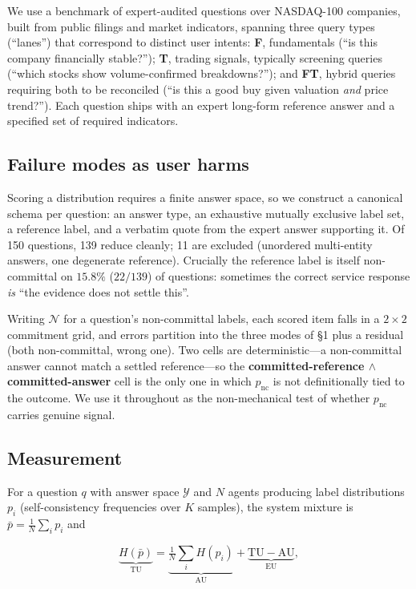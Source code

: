 \documentclass[sigconf,anonymous,review]{acmart}
\begin{document}
We use a benchmark of expert-audited questions over NASDAQ-100 companies,
built from public filings and market indicators, spanning three query types
(``lanes'') that correspond to distinct user intents: \textbf{F},
fundamentals (``is this company financially stable?''); \textbf{T}, trading
signals, typically screening queries (``which stocks show volume-confirmed
breakdowns?''); and \textbf{FT}, hybrid queries requiring both to be
reconciled (``is this a good buy given valuation \emph{and} price trend?'').
Each question ships with an expert long-form reference answer and a
specified set of required indicators.

\subsection{Failure modes as user harms}

Scoring a distribution requires a finite answer space, so we construct a
canonical schema per question: an answer type, an exhaustive mutually
exclusive label set, a reference label, and a verbatim quote from the expert
answer supporting it. Of 150 questions, 139 reduce cleanly; 11 are excluded
(unordered multi-entity answers, one degenerate reference). Crucially the
reference label is itself non-committal on $15.8\%$ ($22/139$) of questions:
sometimes the correct service response \emph{is} ``the evidence does not
settle this''.

Writing $\mathcal{N}$ for a question's non-committal labels, each scored item
falls in a $2\times2$ commitment grid, and errors partition into the three
modes of \S1 plus a residual (both non-committal, wrong one). Two cells are
deterministic---a non-committal answer cannot match a settled reference---so
the \textbf{committed-reference $\wedge$ committed-answer} cell is the only
one in which $p_{\mathrm{nc}}$ is not definitionally tied to the outcome. We
use it throughout as the non-mechanical test of whether $p_{\mathrm{nc}}$
carries genuine signal.

\subsection{Measurement}

For a question $q$ with answer space $\mathcal{Y}$ and $N$ agents producing
label distributions $p_i$ (self-consistency frequencies over $K$ samples),
the system mixture is $\bar p = \frac{1}{N}\sum_i p_i$ and

\begin{equation}
\underbrace{H(\bar p)}_{\mathrm{TU}} =
\underbrace{\tfrac{1}{N}\textstyle\sum_i H(p_i)}_{\mathrm{AU}} +
\underbrace{\mathrm{TU}-\mathrm{AU}}_{\mathrm{EU}},
\label{eq:decomp}
\end{equation}
\end{document}
